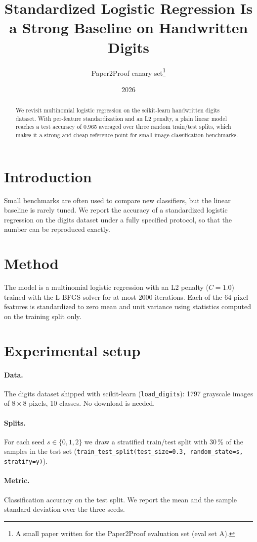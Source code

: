 \documentclass[11pt]{article}
\title{Standardized Logistic Regression Is a Strong Baseline on Handwritten Digits}
\author{Paper2Proof canary set\thanks{A small paper written for the Paper2Proof evaluation set (eval set A).}}
\date{2026}
\begin{document}
\maketitle

\begin{abstract}
We revisit multinomial logistic regression on the scikit-learn handwritten digits dataset.
With per-feature standardization and an L2 penalty, a plain linear model reaches a test accuracy
of 0.965 averaged over three random train/test splits, which makes it a strong and cheap
reference point for small image classification benchmarks.
\end{abstract}

\section{Introduction}
Small benchmarks are often used to compare new classifiers, but the linear baseline is rarely
tuned. We report the accuracy of a standardized logistic regression on the digits dataset under
a fully specified protocol, so that the number can be reproduced exactly.

\section{Method}
The model is a multinomial logistic regression with an L2 penalty ($C = 1.0$) trained with the
L-BFGS solver for at most 2000 iterations. Each of the 64 pixel features is standardized to zero
mean and unit variance using statistics computed on the training split only.

\section{Experimental setup}
\paragraph{Data.} The digits dataset shipped with scikit-learn (\texttt{load\_digits}): 1797
grayscale images of $8 \times 8$ pixels, 10 classes. No download is needed.
\paragraph{Splits.} For each seed $s \in \{0, 1, 2\}$ we draw a stratified train/test split with
30\,\% of the samples in the test set (\texttt{train\_test\_split(test\_size=0.3,
random\_state=s, stratify=y)}).
\paragraph{Metric.} Classification accuracy on the test split. We report the mean and the sample
standard deviation over the three seeds.
\end{document}
